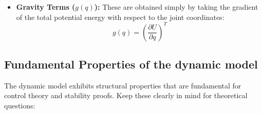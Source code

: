 \documentclass[11pt,a4paper]{article}
\begin{document}
\begin{itemize}
    They can be systematically computed using the \textbf{Christoffel Symbols} of the first kind:
    \begin{equation}
        c_{ij}(q) = \frac{1}{2} \left( \frac{\partial M_i}{\partial q_j} + \left(\frac{\partial M_i}{\partial q_j}\right)^T - \frac{\partial M}{\partial q_i} \right)
    \end{equation}
    
    \item \textbf{Gravity Terms ($g(q)$):} These are obtained simply by taking the gradient of the total potential energy with respect to the joint coordinates:
    \begin{equation}
        g(q) = \left( \frac{\partial U}{\partial q} \right)^T
    \end{equation}
\end{itemize}

\subsection{Fundamental Properties of the dynamic model}
The dynamic model exhibits structural properties that are fundamental for control theory and stability proofs. Keep these clearly in mind for theoretical questions:
\end{document}
